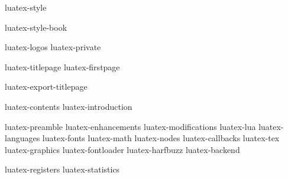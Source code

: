 

\environment luatex-style

\startmode[book]
    \environment luatex-style-book
\stopmode

\environment luatex-logos
\environment luatex-private

\startmode[export]

    \setupbackend
      [export=luatex]

\stopmode

\startdocument
  [manual=Lua\TeX,
   status=stable,
   version=1.19]

\startnotmode[*export]
    \component luatex-titlepage
    \component luatex-firstpage
\stopnotmode

\startmode[*export]
    \component luatex-export-titlepage
\stopmode

\startfrontmatter
    \component luatex-contents
    \component luatex-introduction
\stopfrontmatter

\startbodymatter
    \component luatex-preamble
    \component luatex-enhancements
    \component luatex-modifications
    \component luatex-lua
    \component luatex-languages
    \component luatex-fonts
    \component luatex-math
    \component luatex-nodes
    \component luatex-callbacks
    \component luatex-tex
    \component luatex-graphics
    \component luatex-fontloader
    \component luatex-harfbuzz
    \component luatex-backend
\stopbodymatter

\startbackmatter
    \component luatex-registers
    \component luatex-statistics
\stopbackmatter

\stopdocument
